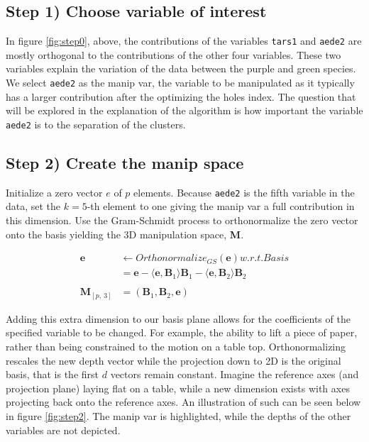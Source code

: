 \documentclass{monashthesis}
\begin{document}
\hypertarget{step-1-choose-variable-of-interest-1}{%
\subsection{Step 1) Choose variable of interest}\label{step-1-choose-variable-of-interest-1}}

In figure \ref{fig:step0}, above, the contributions of the variables \texttt{tars1} and \texttt{aede2} are mostly orthogonal to the contributions of the other four variables. These two variables explain the variation of the data between the purple and green species. We select \texttt{aede2} as the manip var, the variable to be manipulated as it typically has a larger contribution after the optimizing the holes index. The question that will be explored in the explanation of the algorithm is how important the variable \texttt{aede2} is to the separation of the clusters.

\hypertarget{step-2-create-the-manip-space-1}{%
\subsection{Step 2) Create the manip space}\label{step-2-create-the-manip-space-1}}

Initialize a zero vector \(e\) of \(p\) elements. Because \texttt{aede2} is the fifth variable in the data, set the \(k=5\)-th element to one giving the manip var a full contribution in this dimension. Use the Gram-Schmidt process to orthonormalize the zero vector onto the basis yielding the 3D manipulation space, \textbf{M}.

\begin{align*}
  \textbf{e} &\leftarrow Orthonormalize_{GS}(\textbf{e}) w.r.t. Basis \\
  &= \textbf{e} - \langle \textbf{e},\textbf{B}_1 \rangle \textbf{B}_1 - \langle \textbf{e}, \textbf{B}_2 \rangle \textbf{B}_2 \\
  \\
  \textbf{M}_{[p,~3]} &= (\textbf{B}_1,\textbf{B}_2,\textbf{e})
\end{align*}

Adding this extra dimension to our basis plane allows for the coefficients of the specified variable to be changed. For example, the ability to lift a piece of paper, rather than being constrained to the motion on a table top. Orthonormalizing rescales the new depth vector while the projection down to 2D is the original basis, that is the first \(d\) vectors remain constant. Imagine the reference axes (and projection plane) laying flat on a table, while a new dimension exists with axes projecting back onto the reference axes. An illustration of such can be seen below in figure \ref{fig:step2}. The manip var is highlighted, while the depths of the other variables are not depicted.
\end{document}
